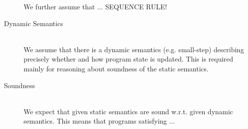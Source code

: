 \begin{description}
    We further assume that ... SEQUENCE RULE!
    
\item[Dynamic Semantics]~\\
    We assume that there is a dynamic semantics (e.g. small-step) describing precisely whether and how program state is updated.
    This is required mainly for reasoning about soundness of the static semantics.
    
\item[Soundness]~\\
    We expect that given static semantics are sound w.r.t. given dynamic semantics.
    This means that programs satisfying ... 
\end{description}